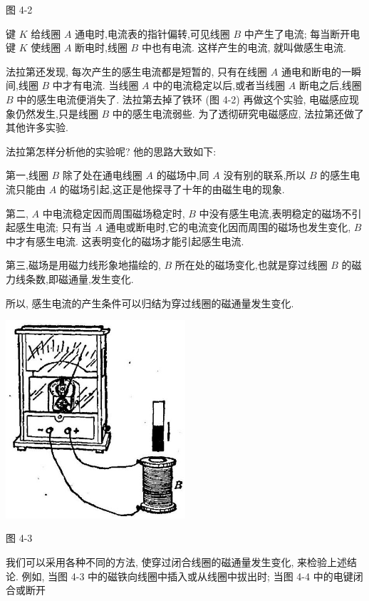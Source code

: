 \documentclass[10pt]{article}
\begin{document}
图 4-2

键 \(K\) 给线圈 \(A\) 通电时,电流表的指针偏转,可见线圈 \(B\) 中产生了电流; 每当断开电键 \(K\) 使线圈 \(A\) 断电时,线圈 \(B\) 中也有电流. 这样产生的电流, 就叫做感生电流.

法拉第还发现, 每次产生的感生电流都是短暂的, 只有在线圈 \(A\) 通电和断电的一瞬间,线圈 \(B\) 中才有电流. 当线圈 \(A\) 中的电流稳定以后,或者当线圈 \(A\) 断电之后,线圈 \(B\) 中的感生电流便消失了. 法拉第去掉了铁环 (图 4-2) 再做这个实验, 电磁感应现象仍然发生,只是线圈 \(B\) 中的感生电流弱些. 为了透彻研究电磁感应, 法拉第还做了其他许多实验.

法拉第怎样分析他的实验呢? 他的思路大致如下:

第一,线圈 \(B\) 除了处在通电线圈 \(A\) 的磁场中,同 \(A\) 没有别的联系,所以 \(B\) 的感生电流只能由 \(A\) 的磁场引起,这正是他探寻了十年的由磁生电的现象.

第二, \(A\) 中电流稳定因而周围磁场稳定时, \(B\) 中没有感生电流,表明稳定的磁场不引起感生电流; 只有当 \(A\) 通电或断电时,它的电流变化因而周围的磁场也发生变化, \(B\) 中才有感生电流. 这表明变化的磁场才能引起感生电流.

第三,磁场是用磁力线形象地描绘的, \(B\) 所在处的磁场变化,也就是穿过线圈 \(B\) 的磁力线条数,即磁通量,发生变化.

所以, 感生电流的产生条件可以归结为穿过线圈的磁通量发生变化.

\begin{center}
\includegraphics[max width=0.5\textwidth]{images/01913056-1f15-74d8-9184-9aab52c9d66b_134_818946.jpg}
\end{center}

图 4-3

我们可以采用各种不同的方法, 使穿过闭合线圈的磁通量发生变化, 来检验上述结论. 例如, 当图 4-3 中的磁铁向线圈中插入或从线圈中拔出时; 当图 4-4 中的电键闭合或断开
\end{document}
